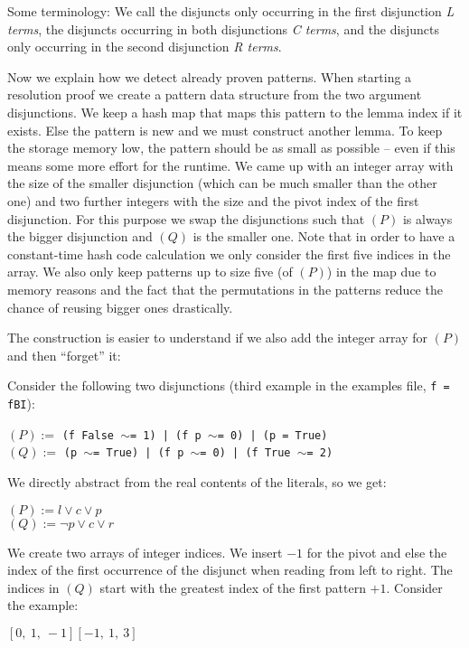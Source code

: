 \documentclass[10pt,a4paper]{article}
\newcommand{\resa}{\ensuremath{(P)}\xspace}
\newcommand{\resb}{\ensuremath{(Q)}\xspace}
\newcommand{\ttt}{\texttt}
\newcommand{\negat}{\ensuremath{\sim}}
\begin{document}
Some terminology: We call the disjuncts only occurring in the first disjunction \emph{L terms}, the disjuncts occurring in both disjunctions \emph{C terms}, and the disjuncts only occurring in the second disjunction \emph{R terms}.

Now we explain how we detect already proven patterns. When starting a resolution proof we create a pattern data structure from the two argument disjunctions. We keep a hash map that maps this pattern to the lemma index if it exists. Else the pattern is new and we must construct another lemma. To keep the storage memory low, the pattern should be as small as possible -- even if this means some more effort for the runtime. We came up with an integer array with the size of the smaller disjunction (which can be much smaller than the other one) and two further integers with the size and the pivot index of the first disjunction. For this purpose we swap the disjunctions such that \resa is always the bigger disjunction and \resb is the smaller one. Note that in order to have a constant-time hash code calculation we only consider the first five indices in the array. We also only keep patterns up to size five (of \resa) in the map due to memory reasons and the fact that the permutations in the patterns reduce the chance of reusing bigger ones drastically.

The construction is easier to understand if we also add the integer array for \resa and then ``forget'' it:

Consider the following two disjunctions (third example in the examples file, \ttt{f = fBI}):
%
\begin{center}
	$\resa :=$ \ttt{(f False \negat= 1) | (f p \negat= 0) | (p = True)} \\
	$\resb :=$ \ttt{(p \negat= True) | (f p \negat= 0) | (f True \negat= 2)}
\end{center}

We directly abstract from the real contents of the literals, so we get:
%
\begin{center}
	$\resa := l \lor c \lor p$ \\
	$\resb := \neg p \lor c \lor r$
\end{center}

We create two arrays of integer indices. We insert $-1$ for the pivot and else the index of the first occurrence of the disjunct when reading from left to right. The indices in \resb start with the greatest index of the first pattern $+ 1$. Consider the example:
%
\begin{center}
	$[0, \ 1, \ -1] [-1, \ 1, \ 3]$
\end{center}
\end{document}
